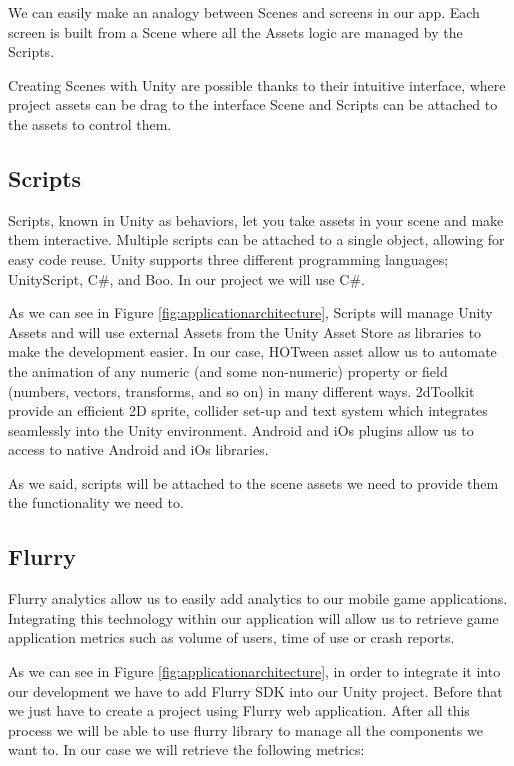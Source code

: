 We can easily make an analogy between Scenes and screens in our app. Each screen is built from a Scene where all the Assets logic are managed by the Scripts.

Creating Scenes with Unity are possible thanks to their intuitive interface, where project assets can be drag to the interface Scene and Scripts can be attached to the assets to control them.

\subsection{Scripts}
\label{subsec:unityscripts}
Scripts, known in Unity as behaviors, let you take assets in your scene and make them interactive. Multiple scripts can be attached to a single object, allowing for easy code reuse. Unity supports three different programming languages; UnityScript, C\#, and Boo. In our project we will use C\#.

As we can see in Figure \ref{fig:applicationarchitecture}, Scripts will manage Unity Assets and will use external Assets from the Unity Asset Store as libraries to make the development easier. In our case, HOTween asset allow us to automate the animation of any numeric (and some non-numeric) property or field (numbers, vectors, transforms, and so on) in many different ways. 2dToolkit provide an efficient 2D sprite, collider set-up and text system which integrates seamlessly into the Unity environment. Android and iOs plugins allow us to access to native Android and iOs libraries.

As we said, scripts will be attached to the scene assets we need to provide them the functionality we need to.

\subsection{Flurry}
Flurry analytics allow us to easily add analytics to our mobile game applications. Integrating this technology within our application will allow us to retrieve game application metrics such as volume of users, time of use or crash reports.

As we can see in Figure \ref{fig:applicationarchitecture}, in order to integrate it into our development we have to add Flurry SDK into our Unity project. Before that we just have to create a project using Flurry web application. After all this process we will be able to use flurry library to manage all the components we want to. In our case we will retrieve the following metrics:

